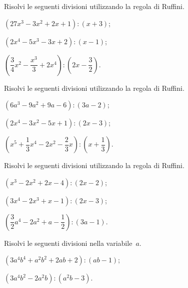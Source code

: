 \begin{esercizio}
\label{ese:11.35}
Risolvi le seguenti divisioni utilizzando la regola di Ruffini.
\begin{multicols}{2}
 \begin{enumeratea}
 \item $\left(27x^{3}-3x^{2}+2x+1\right):(x+3)$;
 \item $\left(2x^{4}-5x^{3}-3x+2\right):(x-1)$;
 \item $\left(\dfrac{3}{4}x^{2}-\dfrac{x^{3}}{3}+2x^{4}\right):\left(2x-\dfrac{3}{2}\right)$.
 \end{enumeratea}
\end{multicols}
\end{esercizio}
\pagebreak
\begin{esercizio}[\Ast]
\label{ese:11.36}
Risolvi le seguenti divisioni utilizzando la regola di Ruffini.
 \begin{enumeratea}
 \item $\left(6a^{3}-9a^{2}+9a-6\right):(3a-2)$;
 \item $(2x^{4}-3x^{2}-5x+1):(2x-3)$;
 \item $\left(x^{5}+\dfrac{1}{3}x^{4}-2x^{2}-\dfrac{2}{3}x\right):\left(x+\dfrac{1}{3}\right)$.
 \end{enumeratea}
\end{esercizio}

\begin{esercizio}[\Ast]
\label{ese:11.37}
Risolvi le seguenti divisioni utilizzando la regola di Ruffini.
 \begin{enumeratea}
 \item $\left(x^{3}-2x^{2}+2x-4\right):(2x-2)$;
 \item $\left(3x^{4}-2x^{3}+x-1\right):(2x-3)$;
 \item $\left(\dfrac{3}{2}a^{4}-2a^{2}+a-\dfrac{1}{2}\right):(3a-1)$.
 \end{enumeratea}
\end{esercizio}

\begin{esercizio}[\Ast]
\label{ese:11.38}
Risolvi le seguenti divisioni nella variabile~$a$.
 \begin{enumeratea}
 \item $\left(3a^{4}b^{4}+a^{2}b^{2}+2ab+2\right):(ab-1)$;
 \item $\left(3a^{4}b^{2}-2a^{2}b\right):(a^{2}b-3)$.
 \end{enumeratea}
\end{esercizio}


